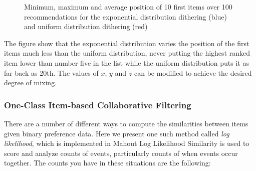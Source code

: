 

\begin{figure}[H]
	\label{fig:minmaxuniform}
	\centering
	\caption[Average position of recommendations with dithering]{Minimum, maximum and average position of 10 first items over 100 recommendations for the exponential distribution dithering (blue) and uniform distribution dithering (red)}

\end{figure}

The figure show that the exponential distribution varies the position of the first items much less
than the uniform distribution, never putting the highest ranked item lower than number five in the
list while the uniform distribution puts it as far back as 20th. The values of $x$, $y$ and $z$ can be modified to
achieve the desired degree of mixing.

\subsubsection{One-Class Item-based Collaborative Filtering}

There are a number of different ways to compute the similarities between items given binary preference data.
Here we present one such method called \emph{log likelihood}, which is implemented in Mahout \cite{mahout}
Log Likelihood Similarity is used to score and analyze counts of events, particularly counts of when events occur together.
The counts you have in these situations are the following:


